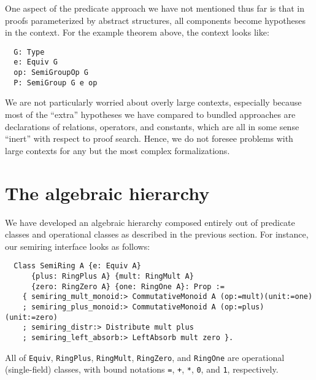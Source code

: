 \documentclass[a4paper,10pt,runningheads]{llncs}
\begin{document}


One aspect of the predicate approach we have not mentioned thus far is that in proofs parameterized by abstract structures, all components become hypotheses in the context. For the example theorem above, the context looks like:
\begin{lstlisting}
  G: Type
  e: Equiv G
  op: SemiGroupOp G
  P: SemiGroup G e op
\end{lstlisting}
We are not particularly worried about overly large contexts, especially because most of the ``extra'' hypotheses we have compared to bundled approaches are declarations of relations, operators, and constants, which are all in some sense ``inert'' with respect to proof search. Hence, we do not foresee problems with large contexts for any but the most complex formalizations.

\section{The algebraic hierarchy}\label{classes}

We have developed an algebraic hierarchy composed entirely out of predicate classes and operational classes as described in the previous section. For instance, our semiring interface looks as follows:
\begin{lstlisting}
  Class SemiRing A {e: Equiv A}
      {plus: RingPlus A} {mult: RingMult A}
      {zero: RingZero A} {one: RingOne A}: Prop :=
    { semiring_mult_monoid:> CommutativeMonoid A (op:=mult)(unit:=one)
    ; semiring_plus_monoid:> CommutativeMonoid A (op:=plus)(unit:=zero)
    ; semiring_distr:> Distribute mult plus
    ; semiring_left_absorb:> LeftAbsorb mult zero }.
\end{lstlisting}
All of \lstinline|Equiv|, \lstinline|RingPlus|, \lstinline|RingMult|, \lstinline|RingZero|, and \lstinline|RingOne| are operational (single-field) classes, with bound notations \lstinline|=|, \lstinline|+|, \lstinline|*|, \lstinline|0|, and \lstinline|1|, respectively.
\end{document}
